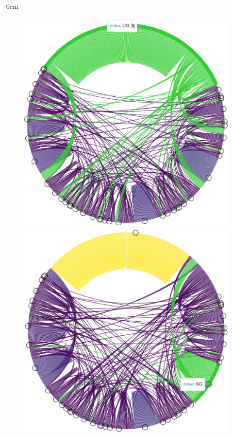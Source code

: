 \documentclass[jmse,review,submit,pdftex,moreauthors]{Definitions/mdpi}
\begin{document}
\begin{adjustwidth}{-\extralength}{0cm}
\begin{figure}[H]
	\centering
	\includegraphics[height=0.3\textheight, keepaspectratio]{pics/coauthorship_country_chord_1.eps}
	\includegraphics[height=0.3\textheight, keepaspectratio]{pics/coauthorship_country_chord_2.eps}

\end{figure}
\end{adjustwidth}
\end{document}
